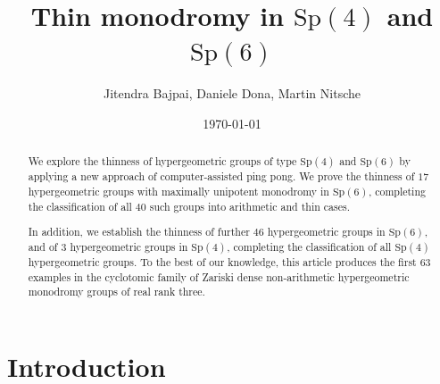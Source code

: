 \documentclass[11pt,a4paper]{amsart}
\theoremstyle{definition}
\theoremstyle{definition}
\numberwithin{equation}{section}
\newcommand{\Sp}{\mathrm{Sp}}
\begin{document}
\date{\today}
\title[Thin monodromy in $\mathrm{Sp}(4)$ and $\mathrm{Sp}(6)$]{Thin monodromy in $\mathrm{Sp}(4)$ and $\mathrm{Sp}(6)$}
\author{Jitendra Bajpai, Daniele Dona, Martin Nitsche}
\address{Max-Planck-Institut f\"ur Mathematik, Bonn, Germany}
\address{Einstein Institute of Mathematics, Hebrew University of Jerusalem, Israel}
\address{Institute of Algebra and Geometry, Karlsruhe Institute of Technology, Germany}


\begin{abstract}
We explore the thinness of hypergeometric groups of type $\Sp(4)$ and $\Sp(6)$ by applying a new approach of computer-assisted ping pong.
We prove the thinness of $17$  hypergeometric groups with maximally unipotent monodromy in $\Sp(6)$, completing the classification of all $40$ such groups into arithmetic and thin cases.

In addition, we establish the thinness of further $46$ hypergeometric groups in $\Sp(6)$, and of $3$ hypergeometric groups in $\Sp(4)$, completing the classification of all $\Sp(4)$ hypergeometric groups.
To the best of our knowledge, this article produces the first $63$ examples in the cyclotomic family of Zariski dense non-arithmetic hypergeometric monodromy groups of real rank three.
\end{abstract}


\maketitle
\tableofcontents

\section{Introduction}\label{se:intro}
\end{document}
